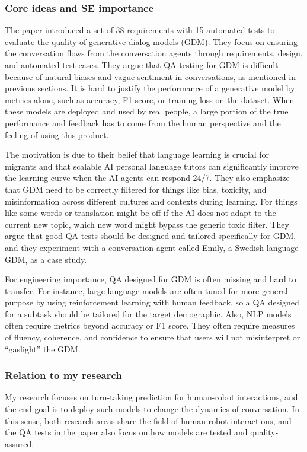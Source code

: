 \documentclass[11pt]{article}
\begin{document}
\subsubsection{Core ideas and SE importance}
The paper introduced a set of 38 requirements with 15 automated tests to evaluate the quality of generative dialog models (GDM). They focus on ensuring the conversation flows from the conversation agents through requirements, design, and automated test cases. They argue that QA testing for GDM is difficult because of natural biases and vague sentiment in conversations, as mentioned in previous sections. It is hard to justify the performance of a generative model by metrics alone, such as accuracy, F1-score, or training loss on the dataset. When these models are deployed and used by real people, a large portion of the true performance and feedback has to come from the human perspective and the feeling of using this product.

The motivation is due to their belief that language learning is crucial for migrants and that scalable AI personal language tutors can significantly improve the learning curve when the AI agents can respond 24/7. They also emphasize that GDM need to be correctly filtered for things like bias, toxicity, and misinformation across different cultures and contexts during learning. For things like some words or translation might be off if the AI does not adapt to the current new topic, which new word might bypass the generic toxic filter. They argue that good QA tests should be designed and tailored specifically for GDM, and they experiment with a conversation agent called Emily, a Swedish-language GDM, as a case study.

For engineering importance, QA designed for GDM is often missing and hard to transfer. For instance, large language models are often tuned for more general purpose by using reinforcement learning with human feedback, so a QA designed for a subtask should be tailored for the target demographic. Also, NLP models often require metrics beyond accuracy or F1 score. They often require measures of fluency, coherence, and confidence to ensure that users will not misinterpret or “gaslight” the GDM.
\subsubsection{Relation to my research}
My research focuses on turn-taking prediction for human-robot interactions, and the end goal is to deploy such models to change the dynamics of conversation. In this sense, both research areas share the field of human-robot interactions, and the QA tests in the paper also focus on how models are tested and quality-assured.
\end{document}
